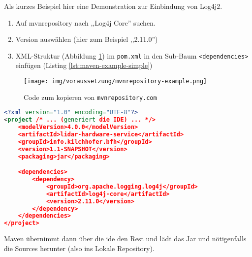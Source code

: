 Als kurzes Beispiel hier eine Demonstration zur Einbindung von Log4j2.
\begin{enumerate}
	\item Auf mvnrepository nach ,,Log4j Core'' suchen.
	\item Version auswählen (hier zum Beispiel ,,2.11.0'')
	\item XML-Struktur (Abbildung \ref{fig:mvnrepository-example}) im \texttt{pom.xml} in den Sub-Baum \texttt{<dependencies>} einfügen (Listing \ref{lst:maven-example-simple})
\end{enumerate}

\begin{figure}[H]
	\centering
	\texttt{[image: img/voraussetzung/mvnrepository-example.png]}
	\caption{Code zum kopieren von \texttt{mvnrepository.com}}
	\label{fig:mvnrepository-example}
\end{figure}

\begin{lstlisting}[language=XML, caption={Simples Beispiel wie ein pom.xml aussieht},label={lst:maven-example-simple}]
<?xml version="1.0" encoding="UTF-8"?>
<project /* ... (generiert die IDE) ... */>
	<modelVersion>4.0.0</modelVersion>
	<artifactId>lidar-hardware-service</artifactId>
	<groupId>info.kilchhofer.bfh</groupId>
	<version>1.1-SNAPSHOT</version>
	<packaging>jar</packaging>

	<dependencies>
		<dependency>
			<groupId>org.apache.logging.log4j</groupId>
			<artifactId>log4j-core</artifactId>
			<version>2.11.0</version>
		</dependency>
	</dependencies>
</project>
\end{lstlisting}
Maven übernimmt dann über die \acrshort{ide} den Rest und lädt das Jar und nötigenfalls die Sources herunter (also ins Lokale Repository).

